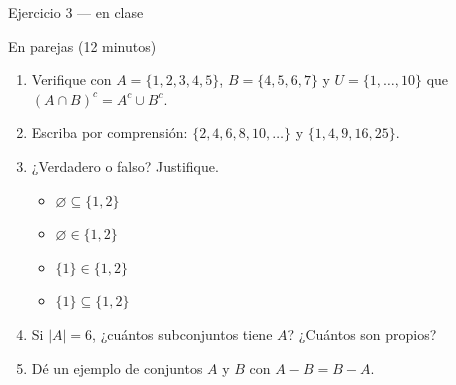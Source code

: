 \documentclass[aspectratio=169,10pt]{beamer}
\begin{document}
\begin{frame}{Ejercicio 3 — en clase}
  \begin{alertblock}{En parejas (12 minutos)}
    \scriptsize
    \begin{enumerate}\setlength{\itemsep}{0.08cm}
      \item Verifique con $A=\{1,2,3,4,5\}$, $B=\{4,5,6,7\}$ y
            $U=\{1,\dots,10\}$ que $(A\cap B)^{c} = A^{c}\cup B^{c}$.
      \item Escriba por comprensión: $\{2,4,6,8,10,\dots\}$ y
            $\{1,4,9,16,25\}$.
      \item ¿Verdadero o falso? Justifique.
            \begin{itemize}\setlength{\itemsep}{-0.04cm}
              \item[a)] $\varnothing \subseteq \{1,2\}$
              \item[b)] $\varnothing \in \{1,2\}$
              \item[c)] $\{1\} \in \{1,2\}$
              \item[d)] $\{1\} \subseteq \{1,2\}$
            \end{itemize}
      \item Si $|A| = 6$, ¿cuántos subconjuntos tiene $A$? ¿Cuántos son
            propios?
      \item Dé un ejemplo de conjuntos $A$ y $B$ con $A - B = B - A$.
    \end{enumerate}
  \end{alertblock}
\end{frame}
\end{document}
